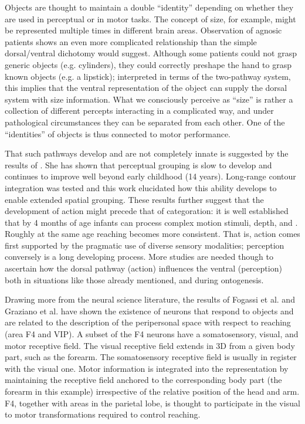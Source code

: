 
Objects are thought to maintain a double ``identity'' depending on
whether they are used in perceptual or in motor tasks. The concept of
size, for example, might be represented multiple times in different
brain areas. Observation of agnosic
patients \cite{jeannerod97cognitive} shows an even more complicated
relationship than the simple dorsal/ventral dichotomy would
suggest.  Although some patients could not grasp generic objects
(e.g. cylinders), they could correctly preshape the hand to grasp
known objects (e.g. a lipstick); interpreted in terms of the
two-pathway system, this implies that the ventral representation of
the object can supply the dorsal system with size information. What we
consciously perceive as ``size'' is rather a collection of different
percepts interacting in a complicated way, and under pathological
circumstances they can be separated from each other. One of the
``identities'' of objects is thus connected to motor performance.

That such pathways develop and are not completely innate is suggested
by the results of \cite{kovacs00human}. She has shown that
perceptual grouping is slow to develop and continues to improve well
beyond early childhood (14 years). Long-range contour integration was
tested and this work elucidated how this ability develops to enable
extended spatial grouping. These results further suggest that the
development of action might precede that of categor\iz{}ation: it is well
established that by 4 months of age infants can process complex
motion stimuli, depth, and \ahhcolor{}.  Roughly at the same age reaching
becomes more consistent.  That is, action comes first
supported by the pragmatic use of diverse sensory modalities;
perception conversely is a long developing process. More studies are
needed though to ascertain how the dorsal pathway (action) influences
the ventral (perception) both in situations like those
already mentioned, and during ontogenesis.

Drawing more from the neural science literature, the results of Fogassi et al.
\cite{fogassi96coding} and Graziano et al. \cite{graziano-hu-gross-1997} have 
shown the existence of neurons that respond to objects and are related to the
description of the peripersonal space with respect to reaching (area F4 and VIP).
A subset of the F4 neurons have a somatosensory, visual, and motor receptive
field. The visual receptive field extends in 3D from a given body part, such
as the forearm. The somatosensory receptive field is usually in register with
the visual one. Motor information is integrated into the representation 
by maintaining the receptive field anchored to the corresponding body part
(the forearm in this example) irrespective of the relative position of the
head and arm. F4, together with areas in the parietal lobe, is thought to 
participate in the visual to motor transformations required to control 
reaching.

